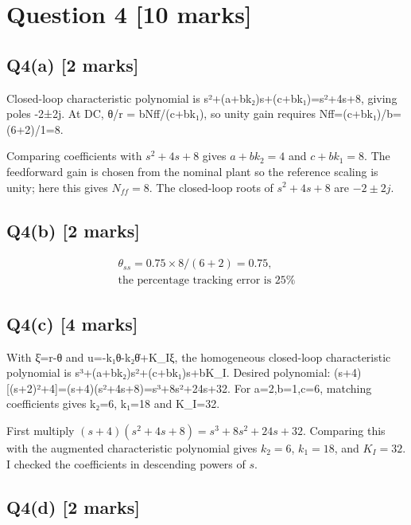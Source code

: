 \documentclass[11pt,a4paper]{article}
\begin{document}
\section*{Question 4 \hfill [10 marks]}
\subsection*{Q4(a) \hfill [2 marks]}

Closed-loop characteristic polynomial is s²+(a+bk₂)s+(c+bk₁)=s²+4s+8, giving poles -2±2j.
At DC, θ/r = bNff/(c+bk₁), so unity gain requires Nff=(c+bk₁)/b=(6+2)/1=8.\par\smallskip Comparing coefficients with $s^2+4s+8$ gives $a+bk_2=4$ and $c+bk_1=8$. The feedforward gain is chosen from the nominal plant so the reference scaling is unity; here this gives $N_{ff}=8$. The closed-loop roots of $s^2+4s+8$ are $-2\pm2j$.

\subsection*{Q4(b) \hfill [2 marks]}

\[\begin{aligned}\theta_{ss} = 0.75\times8/(6+2)=0.75,\\ \text{the percentage tracking error is 25\%}\end{aligned}\]

\subsection*{Q4(c) \hfill [4 marks]}

With ξ̇=r-θ and u=-k₁θ-k₂θ̇+K\_Iξ, the homogeneous closed-loop characteristic polynomial is s³+(a+bk₂)s²+(c+bk₁)s+bK\_I.
Desired polynomial: (s+4)[(s+2)²+4]=(s+4)(s²+4s+8)=s³+8s²+24s+32.
For a=2,b=1,c=6, matching coefficients gives k₂=6, k₁=18 and K\_I=32.\par\smallskip First multiply $(s+4)(s^2+4s+8)=s^3+8s^2+24s+32$. Comparing this with the augmented characteristic polynomial gives $k_2=6$, $k_1=18$, and $K_I=32$. I checked the coefficients in descending powers of $s$.

\subsection*{Q4(d) \hfill [2 marks]}

\vspace{2mm}
\end{document}
